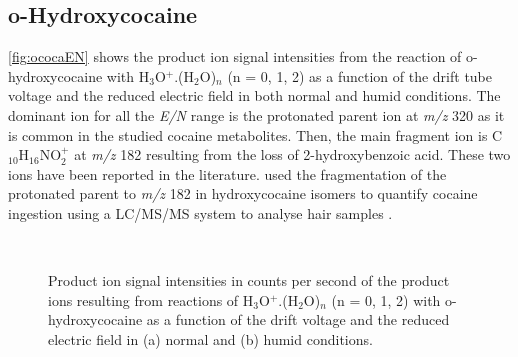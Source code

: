 \subsection{o-Hydroxycocaine}

\autoref{fig:ococaEN} shows the product ion signal intensities from the reaction of o-hydroxycocaine with H$_3$O$^+$.(H$_2$O)$_n$ (n = 0, 1, 2) as a function of the drift tube voltage and the reduced electric field in both normal and humid conditions.
%
The dominant ion for all the \textit{E/N} range is the protonated parent ion at \textit{m/z} 320 as it is common in the studied cocaine metabolites.
%
Then, the main fragment ion is C$_{10}$H$_{16}$NO$_2^+$ at \textit{m/z} 182 resulting from the loss of 2-hydroxybenzoic acid.
%
These two ions have been reported in the literature. 
%
\citeauthor{schaffer2016analysis}  used the fragmentation of the protonated parent to \textit{m/z} 182 in hydroxycocaine isomers to quantify cocaine ingestion using a LC/MS/MS system to analyse hair samples  \cite{schaffer2016analysis}.

\begin{figure}[htbp]
\centering
{}\\
\caption{Product ion signal intensities in counts per second of the product ions resulting from reactions of H$_3$O$^+$.(H$_2$O)$_n$ (n = 0, 1, 2) with o-hydroxycocaine as a function of the drift voltage and the reduced electric field in (a) normal and (b) humid conditions.} 
\label{fig:ococaEN}
\end{figure}


